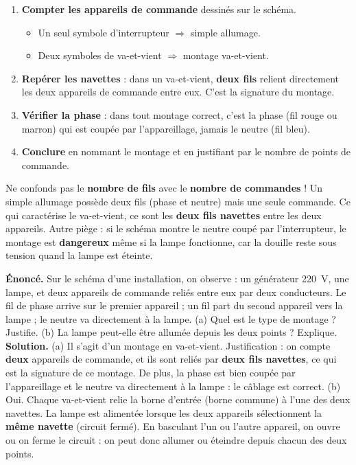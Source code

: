 \documentclass[11pt]{article}
\newcommand{\cle}[1]{{\popxbold\color{popdark}#1}}
\begin{document}
\begin{methode}
\begin{enumerate}
\item \textbf{Compter les appareils de commande} dessinés sur le schéma.
\begin{itemize}
\item Un seul symbole d'interrupteur $\Rightarrow$ simple allumage.
\item Deux symboles de va-et-vient $\Rightarrow$ montage va-et-vient.
\end{itemize}
\item \textbf{Repérer les navettes} : dans un va-et-vient, \textbf{deux fils} relient directement les deux appareils de commande entre eux. C'est la signature du montage.
\item \textbf{Vérifier la phase} : dans tout montage correct, c'est la \cle{phase} (fil rouge ou marron) qui est coupée par l'appareillage, jamais le neutre (fil bleu).
\item \textbf{Conclure} en nommant le montage et en justifiant par le nombre de points de commande.
\end{enumerate}
\end{methode}

\begin{attention}
Ne confonds pas le \textbf{nombre de fils} avec le \textbf{nombre de commandes} ! Un simple allumage possède deux fils (phase et neutre) mais une seule commande. Ce qui caractérise le va-et-vient, ce sont les \textbf{deux fils navettes} entre les deux appareils. Autre piège : si le schéma montre le neutre coupé par l'interrupteur, le montage est \textbf{dangereux} même si la lampe fonctionne, car la douille reste sous tension quand la lampe est éteinte.
\end{attention}

\begin{exoresolu}
\textbf{Énoncé.} Sur le schéma d'une installation, on observe : un générateur \SI{220}{V}, une lampe, et deux appareils de commande reliés entre eux par deux conducteurs. Le fil de phase arrive sur le premier appareil ; un fil part du second appareil vers la lampe ; le neutre va directement à la lampe. (a) Quel est le type de montage ? Justifie. (b) La lampe peut-elle être allumée depuis les deux points ? Explique.
\tcblower
\textbf{Solution.} (a) Il s'agit d'un montage en \cle{va-et-vient}. Justification : on compte \textbf{deux} appareils de commande, et ils sont reliés par \textbf{deux fils navettes}, ce qui est la signature de ce montage. De plus, la phase est bien coupée par l'appareillage et le neutre va directement à la lampe : le câblage est correct. (b) Oui. Chaque va-et-vient relie la borne d'entrée (borne commune) à l'une des deux navettes. La lampe est alimentée lorsque les deux appareils sélectionnent la \textbf{même navette} (circuit fermé). En basculant l'un ou l'autre appareil, on ouvre ou on ferme le circuit : on peut donc allumer ou éteindre depuis chacun des deux points.
\end{exoresolu}
\end{document}
